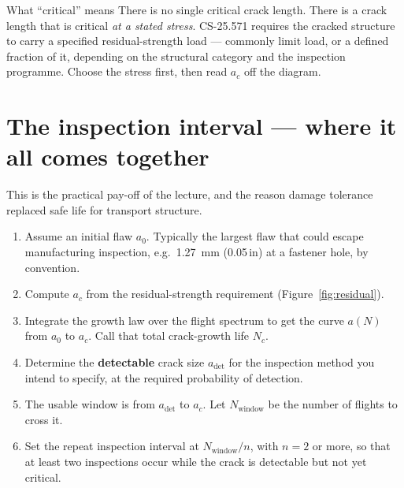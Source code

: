 \documentclass[11pt,a4paper]{article}
\begin{document}
\begin{keybox}{What ``critical'' means}
There is no single critical crack length. There is a crack length that is critical \emph{at a stated stress}. CS-25.571 requires the cracked structure to carry a specified residual-strength load --- commonly limit load, or a defined fraction of it, depending on the structural category and the inspection programme. Choose the stress first, then read $a_c$ off the diagram.
\end{keybox}

\section{The inspection interval --- where it all comes together}

This is the practical pay-off of the lecture, and the reason damage tolerance replaced safe life for transport structure.

\begin{enumerate}[nosep]
  \item Assume an initial flaw $a_0$. Typically the largest flaw that could escape manufacturing inspection, e.g.\ \SI{1.27}{mm} (0.05\,in) at a fastener hole, by convention.
  \item Compute $a_c$ from the residual-strength requirement (Figure~\ref{fig:residual}).
  \item Integrate the growth law over the flight spectrum to get the curve $a(N)$ from $a_0$ to $a_c$. Call that total crack-growth life $N_c$.
  \item Determine the \textbf{detectable} crack size $a_{\mathrm{det}}$ for the inspection method you intend to specify, at the required probability of detection.
  \item The usable window is from $a_{\mathrm{det}}$ to $a_c$. Let $N_{\mathrm{window}}$ be the number of flights to cross it.
  \item Set the repeat inspection interval at $N_{\mathrm{window}}/n$, with $n=2$ or more, so that at least two inspections occur while the crack is detectable but not yet critical.
\end{enumerate}
\end{document}
